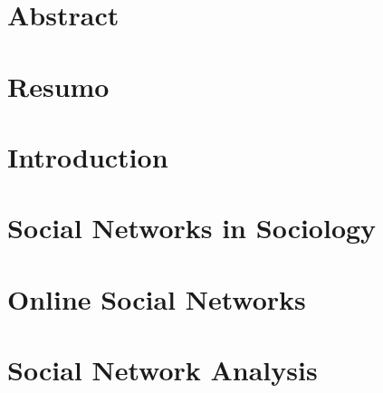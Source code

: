 \documentclass[
  oneside,
  11pt, a4paper,
  footinclude=true,
  headinclude=true,
  cleardoublepage=empty
]{scrbook}
\author{Jorge Caldas}
\date{\myear}
\begin{document}
	\umfrontcover
	\umtitlepage

	\chapter*{Abstract}
	
	
	\cleardoublepage
	\chapter*{Resumo}
	
	
	\tableofcontents
	
	
	\listoffigures
	\listoftables
	\printglossary[type=\acronymtype]
	\clearpage
	\thispagestyle{empty}
	
	
	\chapter{Introduction}
	
	
	
	\chapter{Social Networks in Sociology}
	
	
	
	\chapter{Online Social Networks}
	
	
	
	\chapter{Social Network Analysis}
	
\end{document}
